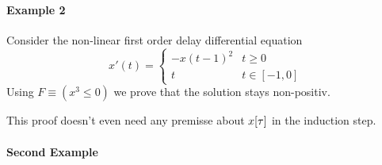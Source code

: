 \documentclass[10pt]{report}
\begin{document}
            \paragraph{Example 2}
                \label{sec:ddi-example-2}
                Consider the non-linear first order delay differential equation
                \begin{equation}
                    x'(t) = \begin{cases}
                         -x(t-1)^2 & t \geq 0\\
                         t & t \in [-1,0]
                    \end{cases}
                \end{equation}
                Using $F\equiv(x^3\leq 0)$ we prove that the solution stays non-positiv.
                \begin{sequentdeduction}
                \end{sequentdeduction}
                This proof doesn't even need any premisse about $\xtau$ in the induction step.
            \paragraph{Second Example}
            \label{sec:second-example}
\end{document}
